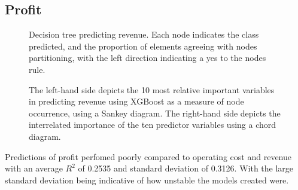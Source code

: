 \documentclass[review,12pt,authoryear]{elsarticle}
\begin{document}
\begin{linenumbers}
 \subsection{Profit}

\begin{figure} 
  \caption{Decision tree predicting revenue. Each node indicates the class predicted, and the proportion of elements agreeing with nodes partitioning, with the left direction indicating a yes to the nodes rule.}\label{fig:revenue_tree}
 \end{figure}
 
 \begin{figure}
  \caption{The left-hand side depicts the 10 most relative important variables in predicting revenue using XGBoost as a measure of node occurrence, using a Sankey diagram. The right-hand side depicts the interrelated importance of the ten predictor variables using a chord diagram.}\label{fig:profit}
 \end{figure}

Predictions of profit perfomed poorly compared to operating cost and revenue with an average $R^2$ of 0.2535 and standard deviation of 0.3126. With the large standard deviation being indicative of how unstable the models created were.

\end{linenumbers}
 
\end{document}
